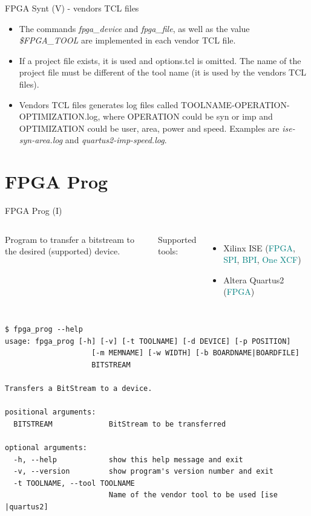\documentclass{beamer}
\begin{document}
\begin{frame}[fragile]{FPGA Synt (V) - vendors TCL files}
  \begin{itemize}
    \item The commands \textit{fpga\_device} and \textit{fpga\_file}, as well
          as the value \textit{\$FPGA\_TOOL} are implemented in each vendor TCL
          file.
    \item If a project file exists, it is used and options.tcl is omitted.
          The name of the project file must be different of the tool name
          (it is used by the vendors TCL files).
    \item Vendors TCL files generates log files called
          TOOLNAME-OPERATION-OPTIMIZATION.log, where OPERATION could be syn or
          imp and OPTIMIZATION could be user, area, power and speed.
          Examples are \textit{ise-syn-area.log} and \textit{quartus2-imp-speed.log}.
  \end{itemize}
\end{frame}


\section{FPGA Prog}

\begin{frame}[fragile]{FPGA Prog (I)}
  \begin{columns}
      \begin{block}{}
        \small
        Program to transfer a bitstream to the desired (supported) device.
      \end{block}{}
      \small Supported tools:
      \begin{itemize}
        \tiny
        \item Xilinx ISE (\textcolor{teal}{FPGA}, \textcolor{teal}{SPI}, \textcolor{teal}{BPI}, \textcolor{teal}{One XCF})
        \item Altera Quartus2 (\textcolor{teal}{FPGA})
      \end{itemize}
  \end{columns}
  \tiny
  \begin{verbatim}
$ fpga_prog --help
usage: fpga_prog [-h] [-v] [-t TOOLNAME] [-d DEVICE] [-p POSITION]
                    [-m MEMNAME] [-w WIDTH] [-b BOARDNAME|BOARDFILE]
                    BITSTREAM

Transfers a BitStream to a device.

positional arguments:
  BITSTREAM             BitStream to be transferred

optional arguments:
  -h, --help            show this help message and exit
  -v, --version         show program's version number and exit
  -t TOOLNAME, --tool TOOLNAME
                        Name of the vendor tool to be used [ise |quartus2]
  \end{verbatim}
\end{frame}
\end{document}
